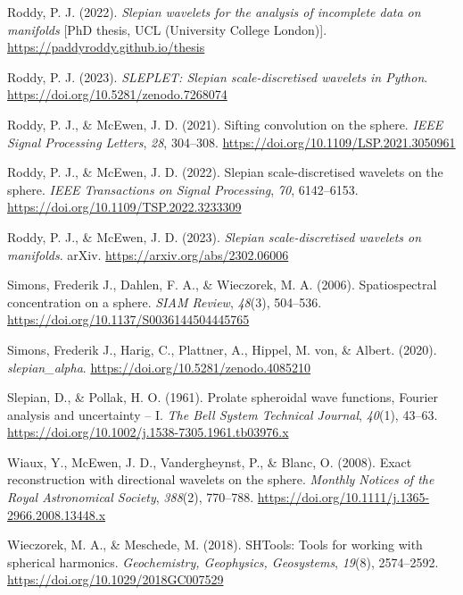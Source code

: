 \documentclass[
]{article}
\newlength{\cslhangindent}
\newlength{\cslentryspacingunit} %
\newenvironment{CSLReferences}[2] %
 {%
  \setlength{\parindent}{0pt}
  \ifodd #1
  \let\oldpar\par
  \def\par{\hangindent=\cslhangindent\oldpar}
  \fi
  \setlength{\parskip}{#2\cslentryspacingunit}
 }%
 {}
\begin{document}
\begin{CSLReferences}{1}{0}
\leavevmode{}%
Roddy, P. J. (2022). \emph{Slepian wavelets for the analysis of
incomplete data on manifolds} {[}PhD thesis, UCL (University College
London){]}. \url{https://paddyroddy.github.io/thesis}

\leavevmode{}%
Roddy, P. J. (2023). \emph{SLEPLET: {S}lepian scale-discretised wavelets
in {P}ython}. \url{https://doi.org/10.5281/zenodo.7268074}

\leavevmode{}%
Roddy, P. J., \& McEwen, J. D. (2021). Sifting convolution on the
sphere. \emph{IEEE Signal Processing Letters}, \emph{28}, 304--308.
\url{https://doi.org/10.1109/LSP.2021.3050961}

\leavevmode{}%
Roddy, P. J., \& McEwen, J. D. (2022). Slepian scale-discretised
wavelets on the sphere. \emph{IEEE Transactions on Signal Processing},
\emph{70}, 6142--6153. \url{https://doi.org/10.1109/TSP.2022.3233309}

\leavevmode{}%
Roddy, P. J., \& McEwen, J. D. (2023). \emph{Slepian scale-discretised
wavelets on manifolds}. arXiv. \url{https://arxiv.org/abs/2302.06006}

\leavevmode{}%
Simons, Frederik J., Dahlen, F. A., \& Wieczorek, M. A. (2006).
Spatiospectral concentration on a sphere. \emph{SIAM Review},
\emph{48}(3), 504--536. \url{https://doi.org/10.1137/S0036144504445765}

\leavevmode{}%
Simons, Frederik J., Harig, C., Plattner, A., Hippel, M. von, \& Albert.
(2020). \emph{{slepian\_alpha}}.
\url{https://doi.org/10.5281/zenodo.4085210}

\leavevmode{}%
Slepian, D., \& Pollak, H. O. (1961). Prolate spheroidal wave functions,
{F}ourier analysis and uncertainty -- {I}. \emph{The Bell System
Technical Journal}, \emph{40}(1), 43--63.
\url{https://doi.org/10.1002/j.1538-7305.1961.tb03976.x}

\leavevmode{}%
Wiaux, Y., McEwen, J. D., Vandergheynst, P., \& Blanc, O. (2008). Exact
reconstruction with directional wavelets on the sphere. \emph{Monthly
Notices of the Royal Astronomical Society}, \emph{388}(2), 770--788.
\url{https://doi.org/10.1111/j.1365-2966.2008.13448.x}

\leavevmode{}%
Wieczorek, M. A., \& Meschede, M. (2018). {SHTools}: Tools for working
with spherical harmonics. \emph{Geochemistry, Geophysics, Geosystems},
\emph{19}(8), 2574--2592. \url{https://doi.org/10.1029/2018GC007529}

\end{CSLReferences}
\end{document}
